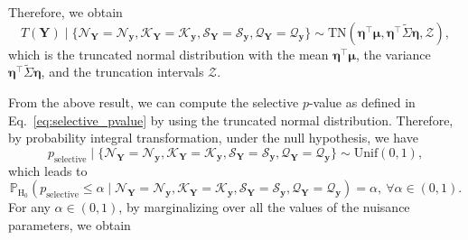 %
Therefore, we obtain
%
\begin{equation}
    T(\bm{Y}) \mid
    \{
    \mathcal{N}_{\bm{Y}} = \mathcal{N}_{\bm{y}},
    \mathcal{K}_{\bm{Y}} = \mathcal{K}_{\bm{y}},
    \mathcal{S}_{\bm{Y}} = \mathcal{S}_{\bm{y}},
    \mathcal{Q}_{\bm{Y}} = \mathcal{Q}_{\bm{y}}
    \}
    \sim
    \mathrm{TN}(\bm{\eta}^\top\bm{\mu}, \bm{\eta}^\top\tilde{\Sigma}\bm{\eta}, \mathcal{Z}),
\end{equation}
%
which is the truncated normal distribution with the mean $\bm{\eta}^\top\bm{\mu}$, the variance $\bm{\eta}^\top\tilde{\Sigma}\bm{\eta}$, and the truncation intervals $\mathcal{Z}$.
%

From the above result, we can compute the selective $p$-value as defined in Eq.~\eqref{eq:selective_pvalue} by using the truncated normal distribution.
%
Therefore, by probability integral transformation, under the null hypothesis, we have
%
\begin{equation}
    p_\mathrm{selective} \mid
    \{
    \mathcal{N}_{\bm{Y}} = \mathcal{N}_{\bm{y}},
    \mathcal{K}_{\bm{Y}} = \mathcal{K}_{\bm{y}},
    \mathcal{S}_{\bm{Y}} = \mathcal{S}_{\bm{y}},
    \mathcal{Q}_{\bm{Y}} = \mathcal{Q}_{\bm{y}}
    \}
    \sim
    \mathrm{Unif}(0, 1),
\end{equation}
%
which leads to
%
\begin{equation}
    \mathbb{P}_{\mathrm{H}_0}
    \left(
    p_\mathrm{selective} \leq \alpha \mid
    \mathcal{N}_{\bm{Y}} = \mathcal{N}_{\bm{y}},
    \mathcal{K}_{\bm{Y}} = \mathcal{K}_{\bm{y}},
    \mathcal{S}_{\bm{Y}} = \mathcal{S}_{\bm{y}},
    \mathcal{Q}_{\bm{Y}} = \mathcal{Q}_{\bm{y}}
    \right)
    =\alpha,\
    \forall\alpha\in(0,1).
\end{equation}
%
For any $\alpha\in(0,1)$, by marginalizing over all the values of the nuisance parameters, we obtain
%
